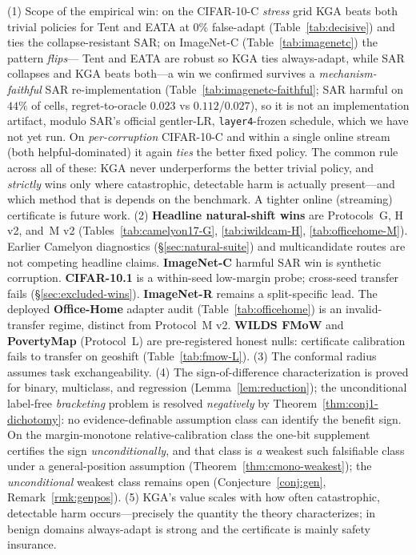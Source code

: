 \documentclass[conference]{IEEEtran}
\theoremstyle{plain}
\theoremstyle{definition}
\begin{document}
\medskip
(1) Scope of the empirical win: on the CIFAR-10-C \emph{stress} grid \textsc{KGA} beats both
trivial policies for Tent and EATA at $0\%$ false-adapt (Table~\ref{tab:decisive}) and ties
the collapse-resistant SAR; on ImageNet-C (Table~\ref{tab:imagenetc}) the pattern \emph{flips}---
Tent and EATA are robust so \textsc{KGA} ties always-adapt, while SAR collapses and \textsc{KGA}
beats both---a win we confirmed survives a \emph{mechanism-faithful} SAR re-implementation
(Table~\ref{tab:imagenetc-faithful}; SAR harmful on $44\%$ of cells, regret-to-oracle $0.023$ vs
$0.112$/$0.027$), so it is not an implementation artifact, modulo SAR's official gentler-LR,
\texttt{layer4}-frozen schedule, which we have not yet run. On \emph{per-corruption} CIFAR-10-C and within a single online stream (both
helpful-dominated) it again \emph{ties} the better fixed policy. The common rule across all of
these: \textsc{KGA} never underperforms the better trivial policy, and \emph{strictly} wins only
where catastrophic, detectable harm is actually present---and which method that is depends on the
benchmark. A tighter online (streaming) certificate is future work.
(2) \textbf{Headline natural-shift wins} are Protocols~G, H v2, and~M v2
(Tables~\ref{tab:camelyon17-G}, \ref{tab:iwildcam-H}, \ref{tab:officehome-M}).
Earlier Camelyon diagnostics (\S\ref{sec:natural-suite}) and multicandidate routes are not
competing headline claims. \textbf{ImageNet-C} harmful SAR win is synthetic corruption.
\textbf{CIFAR-10.1} is a within-seed low-margin probe; cross-seed transfer fails
(\S\ref{sec:excluded-wins}). \textbf{ImageNet-R} remains a split-specific lead. The deployed
\textbf{Office-Home} adapter audit (Table~\ref{tab:officehome}) is an invalid-transfer regime,
distinct from Protocol~M v2.
\textbf{WILDS FMoW} and \textbf{PovertyMap} (Protocol~L) are
pre-registered honest nulls: certificate calibration fails to transfer on geoshift
(Table~\ref{tab:fmow-L}).
(3) The conformal radius assumes task exchangeability.
(4) The sign-of-difference characterization is proved for binary, multiclass, and
regression (Lemma~\ref{lem:reduction}); the unconditional label-free \emph{bracketing}
problem is resolved \emph{negatively} by Theorem~\ref{thm:conj1-dichotomy}: no
evidence-definable assumption class can identify the benefit sign. On the margin-monotone
relative-calibration class the one-bit supplement certifies the sign \emph{unconditionally}, and
that class is \emph{a} weakest such falsifiable class under a general-position assumption
(Theorem~\ref{thm:cmono-weakest}); the \emph{unconditional} weakest class remains open
(Conjecture~\ref{conj:gen}, Remark~\ref{rmk:genpos}).
(5) \textsc{KGA}'s value scales with how often catastrophic, detectable harm
occurs---precisely the quantity the theory characterizes; in benign domains
always-adapt is strong and the certificate is mainly safety insurance.
\clearpage
\end{document}

